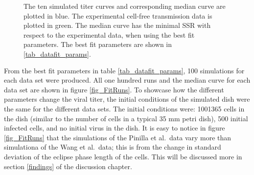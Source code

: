 \begin{figure}
\centering
\caption{The ten simulated titer curves and corresponding median curve are plotted in blue. The experimental cell-free transmission data \citep{pinilla12} is plotted in green. The median curve has the minimal SSR with respect to the experimental data, when using the best fit parameters. The best fit parameters are shown in \ref{tab_datafit_params}. \label{fig_DataFit}}
\end{figure}

From the best fit parameters in table \ref{tab_datafit_params}, 100 simulations for each data set were produced. All one hundred runs and the median curve for each data set are shown in figure \ref{fig_FitRuns}. To showcase how the different parameters change the viral titer, the initial conditions of the simulated dish were the same for the different data sets. The initial conditions were: 1001365 cells in the dish (similar to the number of cells in a typical 35 mm petri dish), 500 initial infected cells, and no initial virus in the dish. It is easy to notice in figure \ref{fig_FitRuns} that the simulations of the Pinilla et al.\ data vary more than simulationa of the Wang et al.\ data; this is from the change in standard deviation of the eclipse phase length of the cells. This will be discussed more in section \ref{findings} of the discussion chapter.

